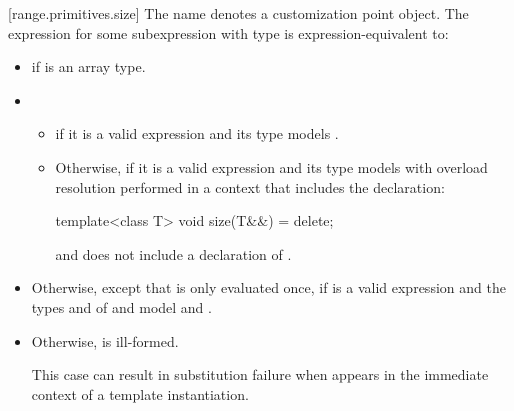 \begin{addedblock}
[range.primitives.size]{}
\pnum
The name  denotes a customization point
object. The expression
 for some subexpression  with type
 is expression-equivalent to:

\begin{itemize}
\item
   if  is an array
  type.

\item
  \begin{itemize}
  \item
     
    if it is a valid expression and its type  models
     .

  \item
    Otherwise, 
    if it is a valid expression and its type  models
     with overload resolution
    performed in a context that includes the declaration:
    \begin{codeblock}
    template<class T> void size(T&&) = delete;
    \end{codeblock}
    and does not include a declaration of .
  \end{itemize}

\item
  Otherwise, 
  except that  is only evaluated once, if   is a valid expression and
  the types  and  of  and
   model
   and
  .

\item
  Otherwise,  is ill-formed.
  {\color{newclr}
  \begin{note}
  This case can result in substitution failure when 
  appears in the immediate context of a template instantiation.
  \end{note}
  } %
\end{itemize}


\end{addedblock}
